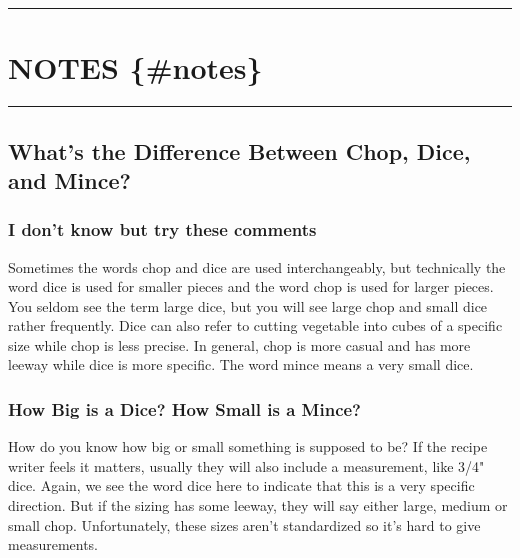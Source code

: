 \documentclass[
]{book}
\begin{document}
\begin{center}\rule{0.5\linewidth}{0.5pt}\end{center}

\hypertarget{notes-notes}{%
\chapter*{NOTES \{\#notes\}}\label{notes-notes}}


\begin{center}\rule{0.5\linewidth}{0.5pt}\end{center}

\hypertarget{notes}{%
\section*{What's the Difference Between Chop, Dice, and Mince?}\label{notes}}


\hypertarget{i-dont-know-but-try-these-comments}{%
\subsection*{I don't know but try these comments}\label{i-dont-know-but-try-these-comments}}


Sometimes the words chop and dice are used interchangeably, but technically the word dice is used for smaller
pieces and the word chop is used for larger pieces.
You seldom see the term large dice, but you will see large chop and small dice rather frequently.
Dice can also refer to cutting vegetable into cubes of a specific size while chop is less precise.
In general, chop is more casual and has more leeway while dice is more specific.
The word mince means a very small dice.

\hypertarget{how-big-is-a-dice-how-small-is-a-mince}{%
\subsection*{How Big is a Dice? How Small is a Mince?}\label{how-big-is-a-dice-how-small-is-a-mince}}


How do you know how big or small something is supposed to be? If the recipe writer feels it matters,
usually they will also include a measurement, like 3/4" dice.
Again, we see the word dice here to indicate that this is a very specific direction.
But if the sizing has some leeway, they will say either large, medium or small chop. Unfortunately,
these sizes aren't standardized so it's hard to give measurements.
\end{document}

